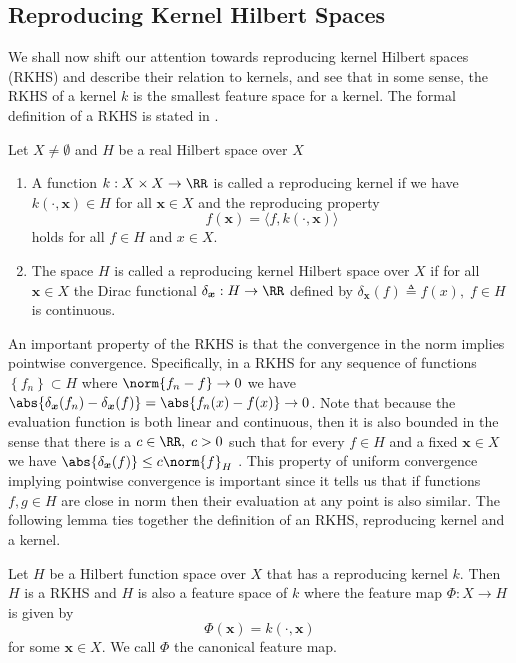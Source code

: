 \subsection{Reproducing Kernel Hilbert Spaces}\label{Section1.2}

We shall now shift our attention towards reproducing kernel Hilbert spaces (RKHS) and describe their relation to kernels, and see that in some sense, the RKHS of a kernel $k$ is the smallest feature space for a kernel. The formal definition of a RKHS is stated in .

\begin{defe}[RKHS] \label{defe: RKHS}
    Let $X \neq \emptyset$ and $H$ be a real Hilbert space over $X$
    \begin{enumerate}
        \item A function $k : X \times X \to \RR$ is called a reproducing kernel if we have $k \left( \cdot, \bm{x} \right) \in H$ for all $\bm{x} \in X$ and the reproducing property
              \[
                  f(\bm{x}) = \langle f , k \left( \cdot, \bm{x} \right) \rangle
              \]
              holds for all $f \in H$ and $x \in X$.
        \item The space $H$ is called a reproducing kernel Hilbert space over $X$ if for all $\bm{x} \in X$ the Dirac functional $\delta_{\bm{x}} : H \to \RR$ defined by $\delta_{\bm{x}} (f) \triangleq f(x), \; f \in H$ is continuous.
    \end{enumerate}
    \cite{SteinwartIngo2008SVMb}
\end{defe}

An important property of the RKHS is that the convergence in the norm implies pointwise convergence. Specifically, in a RKHS for any sequence of functions $\left\{ f_n \right\} \subset H$ where $\norm{f_n - f} \to 0$ we have $\abs{\delta_{\bm{x}} (f_n) - \delta_{\bm{x}} (f)} = \abs{f_n (x) - f (x)} \to 0$. Note that because the evaluation function is both linear and continuous, then it is also bounded in the sense that there is a $c \in \RR, \; c > 0$ such that for every $f \in H$ and a fixed $\bm{x} \in X$ we have $\abs{\delta_{\bm{x}} (f)} \leq c \norm{f}_H$ \cite{BerezanskyMakarovich1996FaV1}. This property of uniform convergence implying pointwise convergence is important since it tells us that if functions $f,g \in H$ are close in norm then their evaluation at any point is also similar. The following lemma ties together the definition of an RKHS, reproducing kernel and a kernel.

\begin{lem}[] \label{lem: RKHS_rk_k}
    Let $H$ be a Hilbert function space over $X$ that has a reproducing kernel $k$. Then $H$ is a RKHS and $H$ is also a feature space of $k$ where the feature map $\Phi : X \to H$ is given by
    \[
        \Phi (\bm{x}) = k \left( \cdot , \bm{x}  \right)
    \]
    for some $\bm{x} \in X$. We call $\Phi$ the canonical feature map.
\end{lem}

